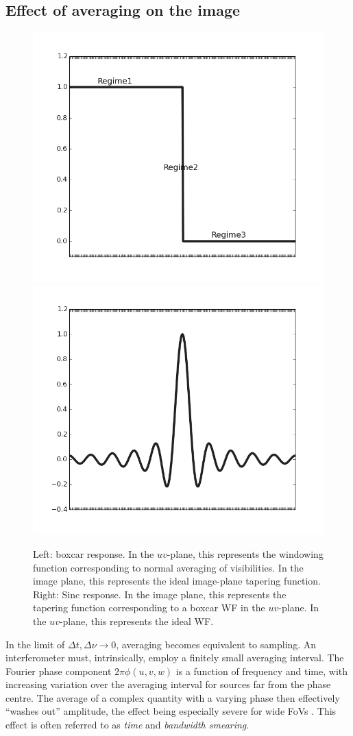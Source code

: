 \documentclass[useAMS,usenatbib]{mn2e}
\begin{document}
\subsection{Effect of averaging on the image}
\label{sec:effectbw}

\begin{figure}
\includegraphics[width=.4\textwidth]{./Figures/idealIPRgrey.png}%
\includegraphics[width=.4\textwidth]{./Figures/idealsincgrey.png}\\
\caption{Left: boxcar response. In the $uv$-plane, this represents the windowing function corresponding to normal
averaging of visibilities. In the image plane, this represents the ideal image-plane tapering function. Right: 
Sinc response. In the image plane, this represents the tapering function corresponding to a boxcar WF in 
the $uv$-plane. In the $uv$-plane, this represents the ideal WF.}
\label{fig:idealWF}
\end{figure}

In the limit of $\Delta t,\Delta \nu \rightarrow 0$, averaging becomes equivalent to sampling. 
An interferometer must, intrinsically, employ a finitely small averaging interval. The Fourier phase 
component $2\pi\phi(u,v,w)$ is a function of frequency and time, with increasing variation over the averaging interval 
for sources far from the phase centre. The average of a complex quantity with a varying phase then effectively ``washes out'' 
amplitude, the effect being especially severe for wide FoVs \citep[for an extensive discussion, see][]{bregman2012system}. This
effect is often referred to as \emph{time} and \emph{bandwidth smearing}.
\end{document}
